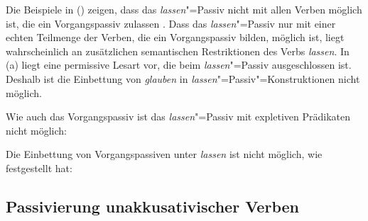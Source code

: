 Die Beispiele in () zeigen, dass das \emph{lassen}"=Passiv nicht mit allen Verben möglich ist,
die ein Vorgangspassiv zulassen \citep[]{Reis76c}.
Dass das \emph{lassen}"=Passiv nur mit einer echten Teilmenge der Verben, die ein Vorgangspassiv bilden,
möglich ist, liegt wahrscheinlich an zusätzlichen semantischen Restriktionen des Verbs \emph{lassen}.
\eal
{}
\zl
In (a) liegt eine permissive Lesart vor, die beim \emph{lassen}"=Passiv ausgeschlossen ist.
Deshalb ist die Einbettung von \emph{glauben} in \emph{lassen}"=Passiv"=Konstruktionen nicht möglich.
\eal
{}
\zl

\noindent
Wie auch das Vorgangspassiv ist das \emph{lassen}"=Passiv mit expletiven Prädikaten nicht möglich:
\z

\noindent
Die Einbettung von Vorgangspassiven unter \emph{lassen} ist nicht möglich,
wie \citet[]{Wilder90a} festgestellt hat:
\eal
{}
\zl
%


\subsection{Passivierung unakkusativischer Verben}
\label{sec-passive-unakkusativ}

